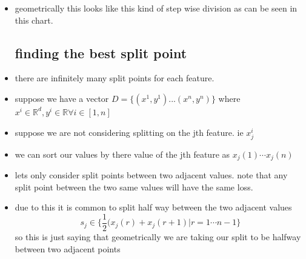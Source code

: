 \documentclass{article}
\begin{document}
\begin{itemize}
\item geometrically this looks like this kind of step wise division as can be seen in this chart. 
\subsection*{ finding the best split point}
\item there are infinitely many split points for each feature. 
\item suppose we have a vector $D=\{(x^1,y^1)...(x^n,y^n)\}$ where $x^i\in \mathbb{R}^{d}, y^i\in \mathbb{R}\forall i \in [1,n]$
\item suppose we are not considering splitting on the jth feature. ie $x^{i}_j$ 
\item we can sort our values by there value of the jth feature as $x_{j}(1)\cdots x_j(n)$
\item lets only consider split points between two adjacent values. note that any split point between the two same values will have the same loss.
\item due to this it is common to split half way between the two adjacent values $$s_j\in \{\frac{1}{2}(x_j(r)+x_{j}(r+1)|r=1\cdots n-1\}$$
so this is just saying that geometrically we are taking our split to be halfway between two adjacent points 

\end{itemize}
\end{document}
